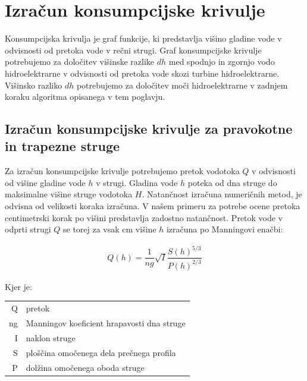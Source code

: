 


\section{Izračun konsumpcijske krivulje}
Konsumpcijska krivulja je graf funkcije, ki predstavlja višino gladine vode v odvisnosti od pretoka vode v rečni strugi. Graf konsumpcijske krivulje potrebujemo za določitev višinske razlike $dh$ med spodnjo in zgornjo vodo hidroelektrarne v odvisnosti od pretoka vode skozi turbine hidroelektrarne. Višinsko razliko $dh$ potrebujemo za določitev moči hidroelektrarne v zadnjem koraku algoritma opisanega v tem poglavju.



\subsection{Izračun konsumpcijske krivulje za pravokotne in trapezne struge} \label{sec:teorija_trapeznaMetoda}
Za izračun konsumpcijske krivulje potrebujemo pretok vodotoka $Q$ v odvisnosti od višine gladine vode $h$ v strugi. Gladina vode $h$ poteka od dna struge do maksimalne višine struge vodotoka $H$. Natančnost izračuna numeričnih metod, je odvisna od velikosti koraka izračuna. V našem primeru za potrebe ocene pretoka centimetrski korak po višini predstavlja zadostno natančnost. Pretok vode v odprti strugi $Q$ se torej za vsak cm višine $h$ izračuna po Manningovi enačbi: 

\begin{ceqn}
\begin{align}
Q(h) = \dfrac{1}{ng} \sqrt{I}\dfrac{S(h)^{5/3}}{P(h)^{2/3}} \label{eq:ManningovaEnacba}
\end{align}
\end{ceqn}

Kjer je:

\begin{table}[htb!]
	\begin{tabular}{r|p{10cm}}
		Q & pretok \\
		ng & Manningov koeficient hrapavosti dna struge\\
		I & naklon struge \\
		S & ploščina omočenega dela prečnega profila \\
		P & dolžina omočenega oboda struge
	\end{tabular}
\end{table}


